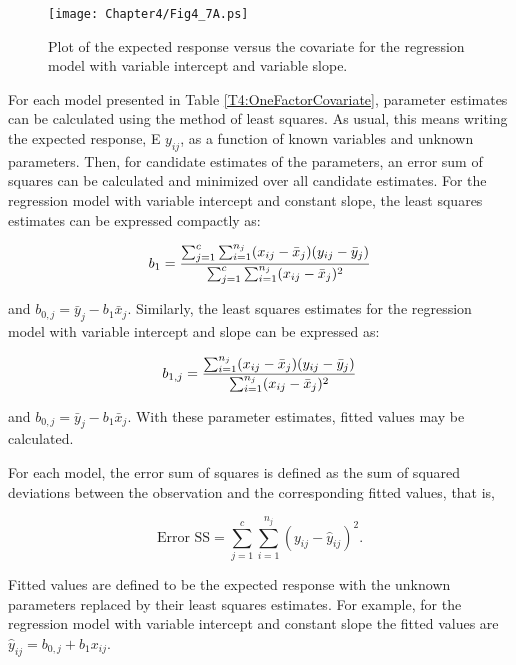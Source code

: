 \begin{figure}[htp]
  \begin{center}
    \texttt{[image: Chapter4/Fig4\_7A.ps]}
    \caption{\label{F4:TheoryVarIntVarSlope} \small  Plot of the expected response versus the covariate for the regression model
with variable intercept and variable slope.}
  \end{center}
\end{figure}

For each model presented in Table \ref{T4:OneFactorCovariate},
parameter estimates can be calculated using the method of least
squares. As usual, this means writing the expected response, E
$y_{ij}$, as a function of known variables and unknown parameters.
Then, for candidate estimates of the parameters, an error sum of
squares can be calculated and minimized over all candidate
estimates. For the regression model with variable intercept and
constant slope, the least squares estimates can be expressed
compactly as:

\begin{equation*}
b_{1}=\frac{\sum_{j=1}^{c}\sum_{i=1}^{n_{j}}(x_{ij}-\bar{x}_{j})(y_{ij}-\bar{%
y}_{j})}{\sum_{j=1}^{c}\sum_{i=1}^{n_{j}}(x_{ij}-\bar{x}_{j})^{2}}
\end{equation*}

\noindent and $b_{0,j}=\bar{y}_{j}-b_{1}\bar{x}_{j}$. Similarly, the
least squares estimates for the regression model with variable
intercept and slope can be expressed as:

\begin{equation*}
b_{1,j}=\frac{\sum_{i=1}^{n_{j}}(x_{ij}-\bar{x}_{j})(y_{ij}-\bar{y}_{j})}{%
\sum_{i=1}^{n_{j}}(x_{ij}-\bar{x}_{j})^{2}}
\end{equation*}

\noindent and $b_{0,j}=\bar{y}_{j}-b_{1}\bar{x}_{j}$. With these
parameter estimates, fitted values may be calculated.

For each model, the error sum of squares is defined as the sum of
squared deviations between the observation and the corresponding
fitted values, that is,

\begin{equation*}
\text{Error
SS}=\sum_{j=1}^{c}\sum_{i=1}^{n_{j}}(y_{ij}-\hat{y}_{ij})^{2}.
\end{equation*}

\noindent Fitted values are defined to be the expected response with
the unknown parameters replaced by their least squares estimates.
For example, for the regression model with variable intercept and
constant slope the fitted values are
$\hat{y}_{ij}=b_{0,j}+b_{1}x_{ij}$.


